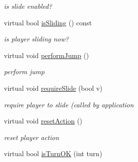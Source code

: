 \begin{DoxyCompactItemize}
\begin{DoxyCompactList}\small\item\em is slide enabled? \end{DoxyCompactList}\item 
virtual bool \hyperlink{class_n_c_t_u_1_1_player_obstacle_ab914419b4bf0f8a3086275318a1e783b}{is\+Sliding} () const \hypertarget{class_n_c_t_u_1_1_player_obstacle_ab914419b4bf0f8a3086275318a1e783b}{}\label{class_n_c_t_u_1_1_player_obstacle_ab914419b4bf0f8a3086275318a1e783b}

\begin{DoxyCompactList}\small\item\em is player sliding now? \end{DoxyCompactList}\item 
virtual void \hyperlink{class_n_c_t_u_1_1_player_obstacle_ad698eb27993cbf8fc03882d44a94e870}{perform\+Jump} ()\hypertarget{class_n_c_t_u_1_1_player_obstacle_ad698eb27993cbf8fc03882d44a94e870}{}\label{class_n_c_t_u_1_1_player_obstacle_ad698eb27993cbf8fc03882d44a94e870}

\begin{DoxyCompactList}\small\item\em perform jump \end{DoxyCompactList}\item 
virtual void \hyperlink{class_n_c_t_u_1_1_player_obstacle_a54dee080388a1056f2534247cdb7b880}{require\+Slide} (bool v)\hypertarget{class_n_c_t_u_1_1_player_obstacle_a54dee080388a1056f2534247cdb7b880}{}\label{class_n_c_t_u_1_1_player_obstacle_a54dee080388a1056f2534247cdb7b880}

\begin{DoxyCompactList}\small\item\em require player to slide (called by application \end{DoxyCompactList}\item 
virtual void \hyperlink{class_n_c_t_u_1_1_player_obstacle_a355241442f142a9617a970a59bde5e33}{reset\+Action} ()\hypertarget{class_n_c_t_u_1_1_player_obstacle_a355241442f142a9617a970a59bde5e33}{}\label{class_n_c_t_u_1_1_player_obstacle_a355241442f142a9617a970a59bde5e33}

\begin{DoxyCompactList}\small\item\em reset player action \end{DoxyCompactList}\item 
virtual bool \hyperlink{class_n_c_t_u_1_1_player_obstacle_ad39b6335c4ca6f67abcafc6015f6afe1}{is\+Turn\+OK} (int turn)\hypertarget{class_n_c_t_u_1_1_player_obstacle_ad39b6335c4ca6f67abcafc6015f6afe1}{}\label{class_n_c_t_u_1_1_player_obstacle_ad39b6335c4ca6f67abcafc6015f6afe1}


\end{DoxyCompactItemize}
